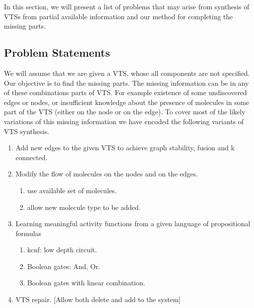 In this section, we will present a list of problems that may arise from
synthesis of VTSs from partial available information
and our method for completing the missing parts.

\subsection{Problem Statements}

We will assume that we are given a VTS, whose all components
are not specified.
%
Our objective is to find the missing parts.
%
The missing information can be in any of these combinations parts of
VTS. For example existence of some undiscovered edges or nodes, or
insufficient knowledge about the presence of molecules in some part of
the VTS (either on the node or on the edge).
%
To cover most of the likely variations of this missing information we
have encoded the following variants of VTS synthesis.



%
%
\begin{enumerate}[label=\Alph*]
\item  Add new edges to the given VTS to achieve graph stability, fusion and k connected. 
\item  Modify the flow of molecules on the nodes and on the edges.
  \begin{enumerate}
  	\item use available set of molecules.
    \item allow new molecule type to be added.     
  \end{enumerate}        
\item Learning meaningful activity functions from a given language of
  propositional formulas
  \begin{enumerate}
    \item kcnf: low depth circuit.
    \item Boolean gates: And, Or.
    \item Boolean gates with linear combination.  
    \end{enumerate}        
\item  VTS repair. [Allow both delete and add to the system]
\end{enumerate}


